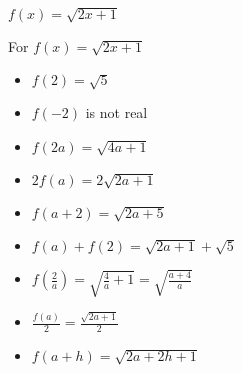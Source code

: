 {$f(x) = \sqrt{2x+1}$}
{For $f(x) = \sqrt{2x+1}$

\begin{itemize}
\item  $f(2) = \sqrt{5}$
\item  $f(-2)$ is not real 
\item  $f(2a) = \sqrt{4a+1}$
\item  $2 f(a) = 2\sqrt{2a+1}$
\item $f(a+2) = \sqrt{2a+5}$
\item $f(a) + f(2) =\sqrt{2a+1} + \sqrt{5}$
\item  $f \left( \frac{2}{a} \right) = \sqrt{\frac{4}{a} + 1} = \sqrt{\frac{a+4}{a}}$
\item $\frac{f(a)}{2} = \frac{\sqrt{2a+1}}{2}$
\item  $f(a + h) = \sqrt{2a+2h+1}$
\end{itemize}
}